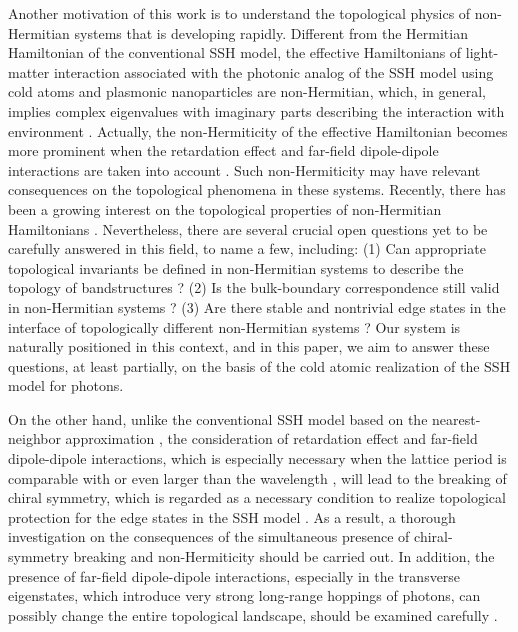 \documentclass[aps,pra,reprint,groupedaddress,nofootinbib,longbibliography,showpacs]{revtex4-1}
\begin{document}
Another motivation of this work is to understand the topological physics of non-Hermitian systems that is developing rapidly. Different from the Hermitian Hamiltonian of the conventional SSH model, the effective Hamiltonians of light-matter interaction associated with the photonic analog of the SSH model using cold atoms and plasmonic nanoparticles are non-Hermitian, which, in general, implies complex eigenvalues with imaginary parts describing the interaction with environment \cite{yelinPRL20172,downing2018topological,pocockArxiv2017}. Actually, the non-Hermiticity of the effective Hamiltonian becomes more prominent when the retardation effect and far-field dipole-dipole interactions are taken into account \cite{downing2018topological,pocockArxiv2017}. Such non-Hermiticity may have relevant consequences on the topological phenomena in these systems. Recently, there has been a growing interest on the topological properties of non-Hermitian Hamiltonians \cite{garrisonPLA1988,rudnerPRL2009,huPRB2011,esakiPRB2011,liangPRA2013,schomerusOL2013,leePRL2016,lingSR2016,leykamPRL2017,jinPRA2017,weimannNaturemat2017,lieuPRB2018,yucePRA2018,xiongJPC2018,shenPRL2018,yao2018edge,yinPRA2018,alvarez2018topologicalreview,dangel2018topological,kunst2018biorthogonal,gong2018topological,kawabata2018nonhermitian}. Nevertheless, there are several crucial open questions yet to be carefully answered in this field, to name a few, including: (1) Can appropriate topological invariants be defined in non-Hermitian systems to describe the topology of bandstructures \cite{esakiPRB2011,liangPRA2013,leykamPRL2017,ozawa2018topological,alvarez2018topologicalreview,shenPRL2018}? (2) Is the bulk-boundary correspondence still valid in non-Hermitian systems \cite{ozawa2018topological,alvarez2018topologicalreview,xiongJPC2018}? (3) Are there stable and nontrivial edge states in the interface of topologically different non-Hermitian systems \cite{weimannNaturemat2017,alvarez2018topologicalreview}? Our system is naturally positioned in this context, and in this paper, we aim to answer these questions, at least partially, on the basis of the cold atomic realization of the SSH model for photons. 
	
On the other hand, unlike the conventional SSH model based on the nearest-neighbor approximation \cite{asboth2016short}, the consideration of retardation effect and far-field dipole-dipole interactions, which is especially necessary when the lattice period is comparable with or even larger than the wavelength \cite{pocockArxiv2017,downing2018topological}, will lead to the breaking of chiral symmetry, which is regarded as a necessary condition to realize topological protection for the edge states in the SSH model \cite{ryuNJP2010}. As a result, a thorough investigation on the consequences of the simultaneous presence of chiral-symmetry breaking and non-Hermiticity should be carried out. In addition, the presence of far-field dipole-dipole interactions, especially in the transverse eigenstates, which introduce very strong long-range hoppings of photons, can possibly change the entire topological landscape, should be examined carefully \cite{pocockArxiv2017}.
	
\end{document}
